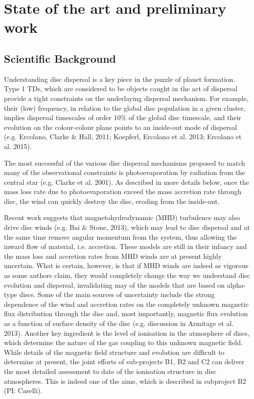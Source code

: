 \documentclass[10pt,fleqn,twoside]{article}
\newcommand{\Tcol}{\color{blue}}
\begin{document}
\section{\Tcol State of the art and preliminary work}
\renewcommand{\leftmark}{\sc State of the Art and preliminary work}

\subsection{Scientific Background}

Understanding disc dispersal is a key piece in the puzzle of planet
formation. Type 1 TDs, which are considered to be objects caught in
the act of dispersal provide a tight constraints on the underlaying
dispersal mechanism. For example, their (low) frequency, in relation
to the global disc population in a given cluster, implies dispersal
timescales of order 10\% of the global disc timescale, and their
evolution on the colour-colour plane points to an inside-out mode of
dispersal (e.g. Ercolano, Clarke \& Hall, 2011; Koepferl, Ercolano et
al. 2013; Ercolano et al. 2015). 

The most successful of the various disc dispersal mechanisms proposed to
match many of the observational constraints 
is photoevaporation by radiation from the central star
(e.g. Clarke et al. 2001). As described in more details below, once
the mass loss rate due to photoevaporation exceed the mass accretion
rate through disc, the wind can quickly destroy the disc, eroding from the inside-out.

Recent work suggests that magnetohydrodynamic (MHD) turbulence may also
drive disc winds (e.g. Bai \& Stone, 2013), which may lead to disc
dispersal and at the same time remove angular momentum from the
system, thus allowing the inward flow of material, i.e. accretion. These models are still in their infancy and the
mass loss and accretion rates from MHD winds are at present highly
uncertain. What is certain, however, is that if MHD winds are indeed
as vigorous as some authors claim, they would completely change the
way we understand disc evolution and dispersal, invalidating may of
the models that are based on alpha-type discs. Some of the main
sources of uncertainty include the strong dependence of the wind and
accretion rates on the completely unknown magnetic flux distribution
through the disc and, most importantly, magnetic flux evolution as a
function of surface density of the disc (e.g. discussion in Armitage
et al. 2013). Another key ingredient is the level of ionisation in the
atmosphere of discs, which determine the nature of the gas coupling to
this unknown magnetic field. While details of the magnetic field
structure and evolution are difficult to determine at present, the
joint efforts of sub-projects B1, B2 and C2 can deliver the most
detailed assessment to date of the ionisation structure in disc
atmospheres. This is indeed one of the aims, which is described in
subproject B2 (PI: Caselli).  
\end{document}
